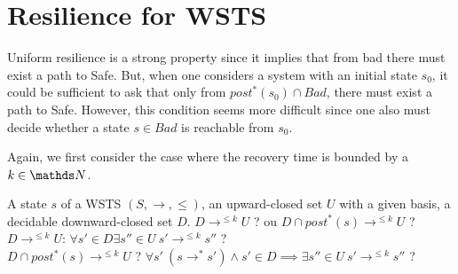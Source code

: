 


\section{Resilience for WSTS}


Uniform resilience is a strong property since it implies that from bad there must exist a path to Safe. But, when one considers a system with an initial state $s_0$, it could be sufficient to ask that only from $post^*(s_0) \cap Bad$, there must exist a path to Safe. However, this condition seems more difficult since one also must decide whether a state $s \in Bad$ is reachable from $s_0$.
%
%

Again, we first consider the case where the recovery time is bounded by a $k \in \N$.

{A state $s$ of a WSTS $(S,\rightarrow, \leq)$, an upward-closed set $U$ with a given basis, a decidable downward-closed set $D$.}
{$D \longrightarrow^{\leq k} U$ ?  ou $D \cap post^*(s) \longrightarrow^{\leq k} U$ ?  \newline}
%
%
$D \longrightarrow^{\leq k} U$: $\forall s' \in D \exists s'' \in U ~ s' \rightarrow^{\leq k} s''$ ?\\
%
$D \cap post^*(s) \longrightarrow^{\leq k} U$ ?
%
$\forall s' ~ (s \rightarrow^* s') \wedge s' \in D  \implies \exists s'' \in U ~ s' \rightarrow^{\leq k} s''$ ?


